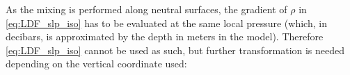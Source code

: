 \documentclass[../main/NEMO_manual]{subfiles}
\begin{document}



As the mixing is performed along neutral surfaces, the gradient of $\rho$ in \autoref{eq:LDF_slp_iso} has to
be evaluated at the same local pressure
(which, in decibars, is approximated by the depth in meters in the model).
Therefore \autoref{eq:LDF_slp_iso} cannot be used as such,
but further transformation is needed depending on the vertical coordinate used:
\end{document}
